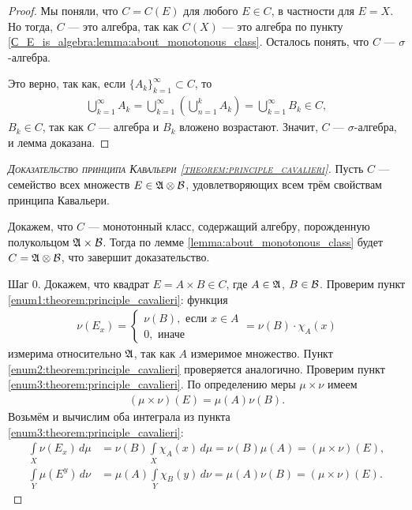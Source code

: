 \begin{proof}
 Мы поняли, что $C = C(E)$ для любого  $E \in C$, в частности для $E = X$. Но тогда, $C$  --- это алгебра, так как $C(X)$ --- это алгебра по пункту \ref{С_E_is_algebra:lemma:about_monotonous_class}. Осталось понять, что $C$ ---  $\sigma$-алгебра.

 Это верно, так как, если $\{A_{k}\}_{k=1}^{\infty} \subset C $, то \begin{align*}
  \bigcup_{k=1}^{\infty} A_k = \bigcup_{k=1}^{\infty} \left( \bigcup_{n=1}^{k} A_k \right) = \bigcup_{k=1}^{\infty} B_k \in C
 ,\end{align*} $B_k \in C$, так как $C$ --- алгебра и $B_k$ вложено возрастают. Значит, $C$ --- $\sigma$-алгебра, и лемма доказана.
\end{proof}

\begin{proof}[\normalfont\textsc{Доказательство принципа Кавальери \ref{theorem:principle_cavalieri}}]
 Пусть $C$ --- семейство всех множеств $E \in \mathfrak{A} \otimes \mathcal{B}$, удовлетворяющих всем трём  свойствам принципа Кавальери.

 Докажем, что $C$  --- монотонный класс, содержащий алгебру, порожденную полукольцом $\mathfrak{A} \times \mathcal{B}$. Тогда по лемме \ref{lemma:about_monotonous_class} будет $C = \mathfrak{A} \otimes \mathcal{B}$, что завершит доказательство.

 Шаг 0. Докажем, что квадрат $E = A \times B \in C$, где $A \in \mathfrak{A}$, $B \in \mathcal{B}$. Проверим пункт \ref{enum1:theorem:principle_cavalieri}: функция \begin{align*}
  \nu(E_x) = \begin{cases}
   \nu(B), \text{ если } x \in A  \\
   0, \text{ иначе }
  \end{cases} = \nu(B) \cdot \chi_A(x)
 \end{align*} измерима относительно $\mathfrak{A}$, так как $A$ измеримое множество. Пункт \ref{enum2:theorem:principle_cavalieri} проверяется аналогично. Проверим пункт \ref{enum3:theorem:principle_cavalieri}. По определению меры $\mu \times \nu$ имеем \begin{align*}
 (\mu \times \nu)(E) = \mu(A) \nu(B)
.\end{align*} Возьмём и вычислим оба интеграла из пункта \ref{enum3:theorem:principle_cavalieri}: \begin{align*}
\int\limits_{X} \nu(E_x) \, d\mu &= \nu(B) \int\limits_{X} \chi_A(x) \, d\mu   = \nu(B) \mu(A) = (\mu \times \nu)(E), \\
\int\limits_{Y} \mu(E^{y}) \, d\nu &= \mu(A) \int\limits_{Y} \chi_B(y) \, d\nu = \mu(A) \nu(B)  = (\mu \times \nu)(E).
\end{align*} 


\end{proof}

